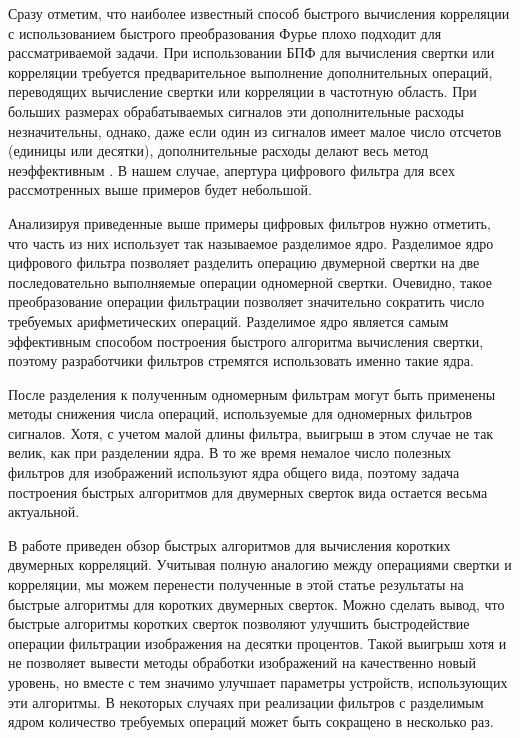 Сразу отметим, что наиболее известный способ быстрого вычисления корреляции с использованием быстрого преобразования Фурье плохо подходит для рассматриваемой задачи. При использовании БПФ для вычисления свертки или корреляции требуется предварительное выполнение дополнительных операций, переводящих вычисление свертки или корреляции в частотную область. При больших размерах обрабатываемых сигналов эти дополнительные расходы незначительны, однако, даже если один из сигналов имеет малое число отсчетов (единицы или десятки), дополнительные расходы делают весь метод неэффективным \cite{altman2015fast}. В нашем случае, апертура цифрового фильтра для всех рассмотренных выше примеров будет небольшой.

Анализируя приведенные выше примеры цифровых фильтров нужно отметить,
что часть из них использует так называемое разделимое ядро. Разделимое ядро цифрового фильтра позволяет разделить операцию двумерной свертки на две последовательно выполняемые операции одномерной свертки. Очевидно, такое преобразование операции фильтрации позволяет значительно сократить число требуемых арифметических операций. Разделимое ядро является самым эффективным способом построения быстрого алгоритма вычисления свертки, поэтому разработчики фильтров стремятся использовать именно такие ядра.

После разделения к полученным одномерным фильтрам могут быть применены методы снижения числа операций, используемые для одномерных фильтров сигналов. Хотя, с учетом малой длины фильтра, выигрыш в этом случае не так велик, как при разделении ядра. В то же время немалое число полезных фильтров для изображений используют ядра общего вида, поэтому задача построения быстрых алгоритмов для двумерных сверток вида остается весьма актуальной.

В работе \cite{altman2015fast} приведен обзор быстрых алгоритмов для вычисления коротких двумерных корреляций. Учитывая полную аналогию между операциями свертки и корреляции, мы можем перенести полученные в этой статье результаты на быстрые алгоритмы для коротких двумерных сверток. Можно сделать вывод, что быстрые алгоритмы коротких сверток позволяют улучшить быстродействие операции фильтрации изображения на десятки процентов. Такой выигрыш хотя и не позволяет вывести методы обработки изображений на качественно новый уровень, но вместе с тем значимо улучшает параметры устройств, использующих эти алгоритмы. В некоторых случаях при реализации фильтров с разделимым ядром количество требуемых операций может быть сокращено в несколько раз. 

